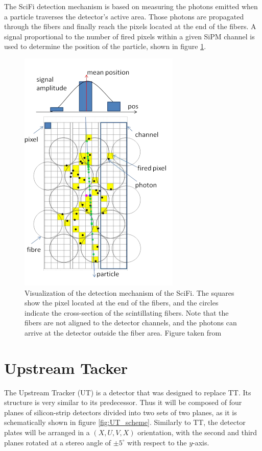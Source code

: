The SciFi detection mechanism is based on measuring the photons emitted when a particle traverses the detector's active area. Those photons are propagated through the fibers and finally reach the pixels located at the end of the fibers. A signal proportional to the number of fired pixels within a given SiPM channel is used to determine the position of the particle, shown in figure \ref{fig:SciFI_idea}. 


\begin{figure}[!h]
\centering
\includegraphics[scale=0.5]{figures/SciFi_idea.PNG}
\caption{Visualization of the detection mechanism of the SciFi. The squares show the pixel located at the end of the fibers, and the circles indicate the cross-section of the scintillating fibers. Note that the fibers are not aligned to the detector channels, and the photons can arrive at the detector outside the fiber area.  Figure taken from \cite{upgrade_tracker_tdr}
\label{fig:SciFI_idea}}
\end{figure}

 
 \section{Upstream Tacker}
 
The Upstream Tracker (UT) is a detector that was designed to replace TT. Its structure is very similar to its predecessor. Thus it will be composed of four planes of silicon-strip detectors divided into two sets of two planes, as it is schematically shown in figure \ref{fig:UT_scheme}. Similarly to TT, the detector plates will be arranged in a $(X, U, V, X)$ orientation, with the second and third planes rotated at a stereo angle of $\pm5^{\circ}$ with respect to the $y$-axis.   

